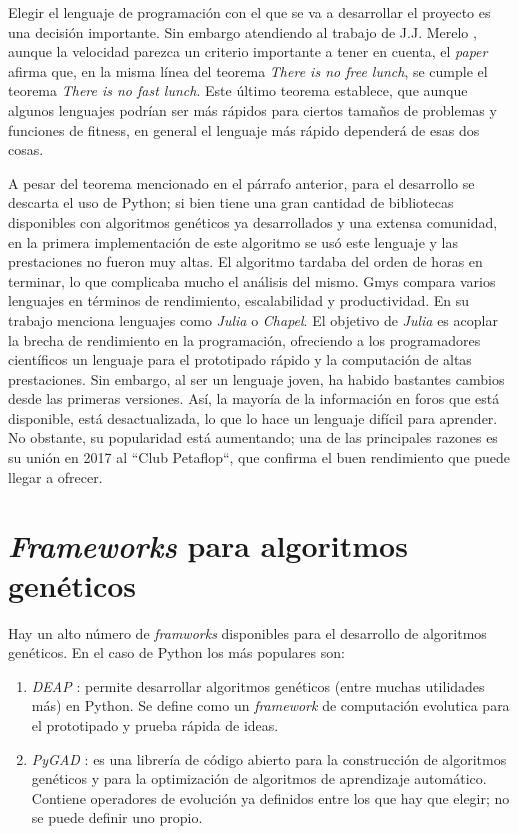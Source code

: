 Elegir el lenguaje de programación con el que se va a desarrollar el proyecto es una decisión importante. Sin embargo atendiendo al trabajo de J.J. Merelo \cite{fast_lunch}, aunque
la velocidad parezca un criterio importante a tener en cuenta, el \emph{paper} afirma que, en la misma línea del teorema \emph{There is no free lunch}, se cumple el teorema
\emph{There is no fast lunch}. Este último teorema establece, que aunque algunos lenguajes podrían ser más rápidos para ciertos tamaños de problemas y
funciones de fitness, en general el lenguaje más rápido dependerá de esas dos cosas.

A pesar del teorema mencionado en el párrafo anterior, para el desarrollo se descarta el uso de Python; si bien tiene una gran cantidad de bibliotecas disponibles con algoritmos
genéticos ya desarrollados y una extensa comunidad, en la primera implementación de este algoritmo se usó este lenguaje \cite{merelo_molina_2021} y las prestaciones no fueron muy altas.
El algoritmo tardaba del orden de horas en terminar, lo que complicaba mucho el análisis del mismo. Gmys \cite{comparative_study} compara varios lenguajes en términos de rendimiento, 
escalabilidad y productividad. En su trabajo menciona lenguajes como \emph{Julia} o \emph{Chapel}. El objetivo de \emph{Julia} es acoplar la brecha de rendimiento en la programación, 
ofreciendo a los programadores científicos un lenguaje para el prototipado rápido y la computación de altas prestaciones. Sin embargo, al ser un lenguaje joven, ha habido bastantes
cambios desde las primeras versiones. Así, la mayoría de la información en foros que está disponible, está desactualizada, lo que lo hace un lenguaje difícil para aprender.
No obstante, su popularidad está aumentando; una de las principales razones es su unión en 2017 al ``Club Petaflop``, que confirma el buen rendimiento que puede llegar a ofrecer.

\section{\textit{Frameworks} para algoritmos genéticos}

Hay un alto número de \emph{framworks} disponibles para el desarrollo de algoritmos genéticos. En el caso de Python los más populares son:

\begin{enumerate}
    \item \emph{DEAP} \cite{deap}: permite desarrollar algoritmos genéticos (entre muchas utilidades más) en Python. Se define como un \emph{framework}
    de computación evolutica para el prototipado y prueba rápida de ideas.
    \item \emph{PyGAD} \cite{pygad}: es una librería de código abierto para la construcción de algoritmos genéticos y para la optimización de algoritmos
    de aprendizaje automático. Contiene operadores de evolución ya definidos entre los que hay que elegir; no se puede definir uno propio.
\end{enumerate}

